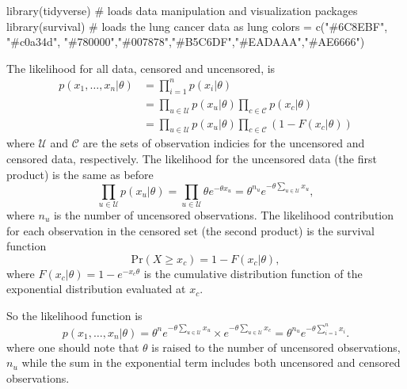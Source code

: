 \documentclass[
  letterpaper,
  DIV=11,
  numbers=noendperiod]{scrartcl}
\newenvironment{Shaded}{\begin{snugshade}}{\end{snugshade}}
\newcommand{\CommentTok}[1]{\textcolor[rgb]{0.37,0.37,0.37}{#1}}
\newcommand{\FunctionTok}[1]{\textcolor[rgb]{0.28,0.35,0.67}{#1}}
\newcommand{\NormalTok}[1]{\textcolor[rgb]{0.00,0.23,0.31}{#1}}
\newcommand{\OtherTok}[1]{\textcolor[rgb]{0.00,0.23,0.31}{#1}}
\newcommand{\StringTok}[1]{\textcolor[rgb]{0.13,0.47,0.30}{#1}}
\begin{document}
\begin{tcolorbox}[enhanced jigsaw, coltitle=black, breakable, colbacktitle=quarto-callout-note-color!10!white, colframe=quarto-callout-note-color-frame, bottomrule=.15mm, toprule=.15mm, rightrule=.15mm, arc=.35mm, colback=white, opacityback=0, bottomtitle=1mm, leftrule=.75mm, title={Solution}, titlerule=0mm, toptitle=1mm, left=2mm, opacitybacktitle=0.6]

\begin{Shaded}
\begin{Highlighting}[]
\FunctionTok{library}\NormalTok{(tidyverse) }\CommentTok{\# loads data manipulation and visualization packages}
\FunctionTok{library}\NormalTok{(survival) }\CommentTok{\# loads the lung cancer data as \textasciigrave{}lung\textasciigrave{}}
\NormalTok{colors }\OtherTok{=} \FunctionTok{c}\NormalTok{(}\StringTok{"\#6C8EBF"}\NormalTok{, }\StringTok{"\#c0a34d"}\NormalTok{, }\StringTok{"\#780000"}\NormalTok{,}\StringTok{"\#007878"}\NormalTok{,}\StringTok{"\#B5C6DF"}\NormalTok{,}\StringTok{"\#EADAAA"}\NormalTok{,}\StringTok{"\#AE6666"}\NormalTok{)}
\end{Highlighting}
\end{Shaded}

The likelihood for all data, censored and uncensored, is \[
\begin{align}
p(x_1,\ldots,x_n \vert \theta) & = \prod_{i=1}^n p(x_i \vert \theta) \\
& = \prod_{u \in \mathcal{U}} p(x_u \vert \theta) \prod_{c \in \mathcal{C}} p(x_c \vert \theta) \\
& = \prod_{u \in \mathcal{U}} p(x_u \vert \theta) \prod_{c \in \mathcal{C}} \left(1 - F(x_c \vert \theta)\right) 
\end{align}
\] where \(\mathcal{U}\) and \(\mathcal{C}\) are the sets of observation
indicies for the uncensored and censored data, respectively. The
likelihood for the uncensored data (the first product) is the same as
before \[
\prod_{u \in \mathcal{U}} p(x_u \vert \theta) = \prod_{u \in \mathcal{U}} \theta e^{-\theta x_u} = \theta^{n_u} e^{-\theta\sum_{u \in \mathcal{U}} x_u},
\] where \(n_u\) is the number of uncensored observations. The
likelihood contribution for each observation in the censored set (the
second product) is the survival function \[
\mathrm{Pr}(X \geq x_c) = 1 - F(x_c \vert \theta),
\] where \(F(x_c \vert \theta) = 1 - e^{-x_c \theta}\) is the cumulative
distribution function of the exponential distribution evaluated at
\(x_c\).

So the likelihood function is \[
p(x_1,\ldots,x_n \vert \theta) = \theta^n e^{-\theta\sum_{u \in \mathcal{U}} x_u} \times e^{-\theta \sum_{u \in \mathcal{U}} x_c} = \theta^{n_u} e^{-\theta\sum_{i = 1}^n x_i}.
\] where one should note that \(\theta\) is raised to the number of
uncensored observations, \(n_u\) while the sum in the exponential term
includes both uncensored and censored observations.


\end{tcolorbox}
\end{document}
